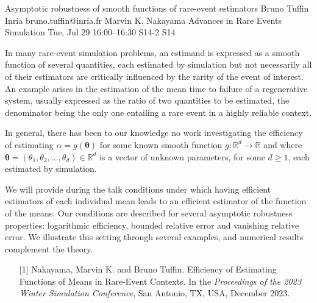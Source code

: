 \begin{talk}
  {Asymptotic robustness of  smooth functions of  rare-event estimators}%
  {Bruno Tuffin}%
  {Inria}%
  {bruno.tuffin@inria.fr}%
  {Marvin K. Nakayama}%
  {Advances in Rare Events Simulation}%
  {Tue, Jul 29 16:00–16:30}%
  {S14-2}%
  {S14}%
				
			
In many rare-event simulation problems, an estimand is expressed  as a smooth function of several quantities,  each
estimated by simulation  but not necessarily all of their estimators are critically influenced by
the rarity of the event of interest.  
An example arises in the estimation of the mean time to failure of a regenerative system, usually expressed as the ratio of two quantities to be estimated, the denominator being the only one  entailing a rare event in a highly reliable context.

In general, there has been to our knowledge no work investigating  the efficiency  of estimating $\alpha = g({\boldsymbol{\theta}})$
for some known  smooth function $g : \mathbb{R}^d \to \mathbb{R}$ and where ${\boldsymbol{\theta}} = (\theta_1, \theta_2, \ldots, \theta_d) \in \mathbb{R}^d$ is a vector of unknown parameters, for some $d \geq 1$, each  estimated by simulation.

We will provide during the talk conditions under which having efficient estimators of each individual mean leads to an efficient estimator of the function of the means. Our conditions are described for several asymptotic robustness properties: logarithmic efficiency, bounded relative error and vanishing relative error.
We illustrate this setting through several examples, and numerical results complement the theory.


			

\medskip


\begin{enumerate}
	\item[{[1]}]  Nakayama, Marvin K. and Bruno Tuffin.  Efficiency of Estimating Functions of Means in Rare-Event Contexts. In the {\it Proceedings of the 2023 Winter Simulation Conference}, San Antonio, TX, USA, December 2023.
\end{enumerate}

\end{talk}

